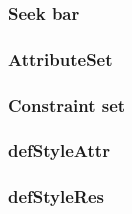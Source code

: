 \documentclass{report}
\begin{document}
    \pagebreak 
    \subsubsection{Seek bar}

    \pagebreak 
    \subsubsection{AttributeSet}

    \pagebreak 
    \subsubsection{Constraint set}

    \pagebreak 
    \subsubsection{defStyleAttr}

    \pagebreak 
    \subsubsection{defStyleRes}

    \pagebreak 
\end{document}

